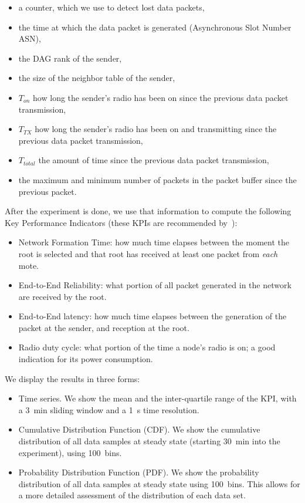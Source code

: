 \documentclass[sensors,article,submit,moreauthors,pdftex]{Definitions/mdpi}
\begin{document}
\begin{itemize}
    \item a counter, which we use to detect lost data packets,
    \item the time at which the data packet is generated (Asynchronous Slot Number ASN),
    \item the DAG rank of the sender,
    \item the size of the neighbor table of the sender,
    \item $T_{on}$ how long the sender's radio has been on since the previous data packet transmission,
    \item $T_{TX}$ how long the sender's radio has been on and transmitting since the previous data packet transmission,
    \item $T_{total}$ the amount of time since the previous data packet transmission,
    \item the maximum and minimum number of packets in the packet buffer since the previous packet.
\end{itemize}


After the experiment is done, we use that information to compute the following Key Performance Indicators (these KPIs are recommended by~\cite{vucinic20key}):

\begin{itemize}
    \item Network Formation Time:
        how much time elapses between the moment the root is selected and that root has received at least one packet from \textit{each} mote. 
    \item End-to-End Reliability:
        what portion of all packet generated in the network are received by the root. 
    \item End-to-End latency:
        how much time elapses between the generation of the packet at the sender, and reception at the root.
    \item Radio duty cycle:
        what portion of the time a node's radio is on; a good indication for its power consumption.
\end{itemize}


We display the results in three forms:

\begin{itemize}
    \item Time series.
        We show the mean and the inter-quartile range of the KPI,
            with a 3~min sliding window and a 1~s time resolution. 
    \item Cumulative Distribution Function (CDF).
        We show the cumulative distribution of all data samples at steady state (starting 30~min into the experiment), using 100~bins.
    \item Probability Distribution Function (PDF).
        We show the probability distribution of all data samples at steady state using 100~bins.
        This allows for a more detailed assessment of the distribution of each data set. 
\end{itemize}
\end{document}
